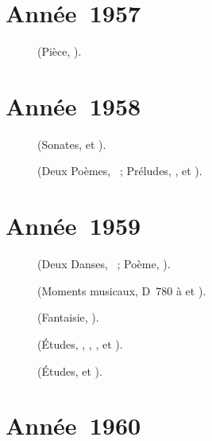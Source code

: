 \section{Année~1957}

\begin{description}
 \item[]
 \Prokofiev{} (Pièce,  ).
\end{description}

\section{Année~1958}

\begin{description}
 \item[]
 \Scriabine{} (Sonates,  et ).
 \item[]
 \Scriabine{} (Deux Poèmes, ~; Préludes,  ,
   et  ).
\end{description}

\section{Année~1959}

\begin{description}
 \item[]
 \Scriabine{} (Deux Danses, ~; Poème, ).
 \item[]
 \Schubert{} (Moments musicaux, D~780  à  et
 ).
 \item[]
 \Scriabine{} (Fantaisie, ).
 \item[]
 \Scriabine{} (Études,  , , ,
  et ).
 \item[]
 \Scriabine{} (Études,   et  ).
\end{description}

\section{Année~1960}

